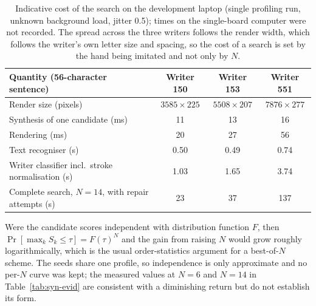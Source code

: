 \begin{table}[!htbp]
\centering
\fontsize{8}{9.6}\selectfont
\setlength{\tabcolsep}{4pt}
\begin{tabularx}{\linewidth}{|X|c|c|c|}
\hline
\textbf{Quantity (56-character sentence)} & \textbf{Writer 150} & \textbf{Writer 153} & \textbf{Writer 551} \\
\hline
Render size (pixels) & $3585\times225$ & $5508\times207$ & $7876\times277$ \\
Synthesis of one candidate (ms) & 11 & 13 & 16 \\
Rendering (ms) & 20 & 27 & 56 \\
Text recogniser (s) & 0.50 & 0.49 & 0.74 \\
Writer classifier incl.\ stroke normalisation (s) & 1.03 & 1.65 & 3.74 \\
Complete search, $N=14$, with repair attempts (s) & 23 & 37 & 137 \\
\hline
\end{tabularx}
\caption{Indicative cost of the search on the development laptop (single profiling run, unknown background load, jitter 0.5); times on the single-board computer were not recorded. The spread across the three writers follows the render width, which follows the writer's own letter size and spacing, so the cost of a search is set by the hand being imitated and not only by $N$.}
\label{tab:syn-cost}
\end{table}

Were the candidate scores independent with distribution function $F$, then $\Pr[\max_kS_k\le\tau]=F(\tau)^N$ and the gain from raising $N$ would grow roughly logarithmically, which is the usual order-statistics argument for a best-of-$N$ scheme.
The seeds share one profile, so independence is only approximate and no per-$N$ curve was kept; the measured values at $N=6$ and $N=14$ in Table~\ref{tab:syn-evid} are consistent with a diminishing return but do not establish its form.
